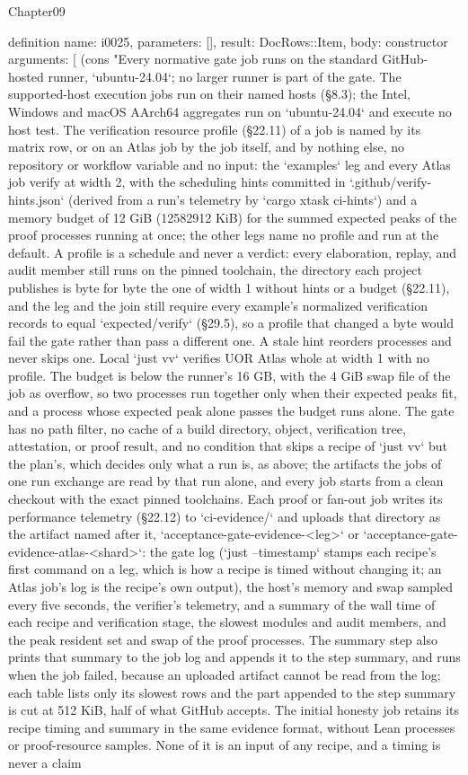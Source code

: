 \begin{lexlean}{Chapter09}
\begin{semanticmodule}
definition{
  name: i0025,
  parameters: [],
  result: DocRows::Item,
  body: constructor{
    arguments: [
      (cons "Every normative gate job runs on the standard GitHub-hosted runner, `ubuntu-24.04`; no larger runner is part of the gate. The supported-host execution jobs run on their named hosts (§8.3); the Intel, Windows and macOS AArch64 aggregates run on `ubuntu-24.04` and execute no host test. The verification resource profile (§22.11) of a job is named by its matrix row, or on an Atlas job by the job itself, and by nothing else, no repository or workflow variable and no input: the `examples` leg and every Atlas job verify at width 2, with the scheduling hints committed in `.github/verify-hints.json` (derived from a run's telemetry by `cargo xtask ci-hints`) and a memory budget of 12 GiB (12582912 KiB) for the summed expected peaks of the proof processes running at once; the other legs name no profile and run at the default. A profile is a schedule and never a verdict: every elaboration, replay, and audit member still runs on the pinned toolchain, the directory each project publishes is byte for byte the one of width 1 without hints or a budget (§22.11), and the leg and the join still require every example's normalized verification records to equal `expected/verify` (§29.5), so a profile that changed a byte would fail the gate rather than pass a different one. A stale hint reorders processes and never skips one. Local `just vv` verifies UOR Atlas whole at width 1 with no profile. The budget is below the runner's 16 GB, with the 4 GiB swap file of the job as overflow, so two processes run together only when their expected peaks fit, and a process whose expected peak alone passes the budget runs alone. The gate has no path filter, no cache of a build directory, object, verification tree, attestation, or proof result, and no condition that skips a recipe of `just vv` but the plan's, which decides only what a run is, as above; the artifacts the jobs of one run exchange are read by that run alone, and every job starts from a clean checkout with the exact pinned toolchains. Each proof or fan-out job writes its performance telemetry (§22.12) to `ci-evidence/` and uploads that directory as the artifact named after it, `acceptance-gate-evidence-<leg>` or `acceptance-gate-evidence-atlas-<shard>`: the gate log (`just --timestamp` stamps each recipe's first command on a leg, which is how a recipe is timed without changing it; an Atlas job's log is the recipe's own output), the host's memory and swap sampled every five seconds, the verifier's telemetry, and a summary of the wall time of each recipe and verification stage, the slowest modules and audit members, and the peak resident set and swap of the proof processes. The summary step also prints that summary to the job log and appends it to the step summary, and runs when the job failed, because an uploaded artifact cannot be read from the log; each table lists only its slowest rows and the part appended to the step summary is cut at 512 KiB, half of what GitHub accepts. The initial honesty job retains its recipe timing and summary in the same evidence format, without Lean processes or proof-resource samples. None of it is an input of any recipe, and a timing is never a claim }}
\end{semanticmodule}
\end{lexlean}

